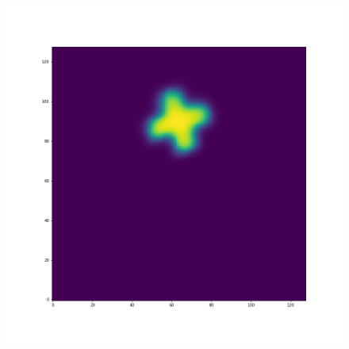 \documentclass[12pt,a4paper]{article}
\begin{document}
\begin{figure}[H]
\begin{minipage}{.3\textwidth}
\end{minipage}%
\begin{minipage}{.3\textwidth}
  \centering
  \includegraphics[width=\linewidth]{Pictures/PlusRotateTestMUSCL/PlusRotateTest_t20.png}
\end{minipage}
\end{figure}
\end{document}
